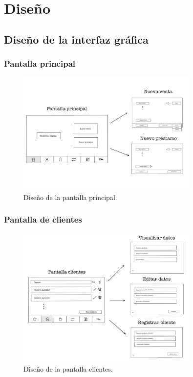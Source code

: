 \chapter{Diseño}
\label{chap:design}

\section{Diseño de la interfaz gráfica}

\subsection{Pantalla principal}

\begin{figure}[ht]
	\centering
	\includegraphics[width=0.8\textwidth, angle=270]{imagenes/pantalla_principal.JPG}
	\caption{Diseño de la pantalla principal.}
	\label{fig:pantallaprincipal}
\end{figure}



\subsection{Pantalla de clientes}

\begin{figure}[ht]
	\centering
	\includegraphics[width=0.8\textwidth, angle=270]{imagenes/pantalla_clientes.JPG}
	\caption{Diseño de la pantalla clientes.}
	\label{fig:pantallaclientes}
\end{figure}

